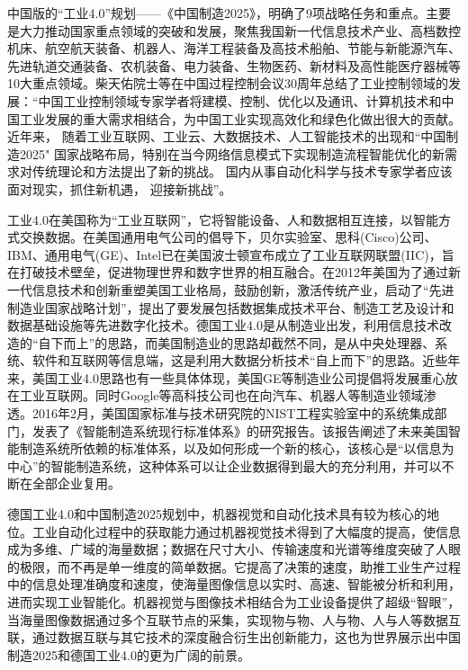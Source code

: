 中国版的“工业4.0”规划——《中国制造2025》，明确了9项战略任务和重点\cite{china2025}。主要是大力推动国家重点领域的突破和发展，聚焦我国新一代信息技术产业、高档数控机床、航空航天装备、机器人、海洋工程装备及高技术船舶、节能与新能源汽车、先进轨道交通装备、农机装备、电力装备、生物医药、新材料及高性能医疗器械等10大重点领域。柴天佑院士等在中国过程控制会议30周年总结了工业控制领域的发展\cite{cai2017ASS}：“中国工业控制领域专家学者将建模、控制、优化以及通讯、计算机技术和中国工业发展的重大需求相结合，为中国工业实现高效化和绿色化做出很大的贡献。 近年来， 随着工业互联网、工业云、大数据技术、人工智能技术的出现和“中国制造2025" 国家战略布局，特别在当今网络信息模式下实现制造流程智能优化的新需求对传统理论和方法提出了新的挑战。 国内从事自动化科学与技术专家学者应该面对现实，抓住新机遇， 迎接新挑战”。

工业4.0在美国称为“工业互联网”，它将智能设备、人和数据相互连接，以智能方式交换数据。在美国通用电气公司的倡导下，贝尔实验室、思科(Cisco)公司、IBM、通用电气(GE)、Intel已在美国波士顿宣布成立了工业互联网联盟(IIC)，旨在打破技术壁垒，促进物理世界和数字世界的相互融合。在2012年美国为了通过新一代信息技术和创新重塑美国工业格局，鼓励创新，激活传统产业，启动了“先进制造业国家战略计划”\cite{US2012}，提出了要发展包括数据集成技术平台、制造工艺及设计和数据基础设施等先进数字化技术。德国工业4.0是从制造业出发，利用信息技术改造的“自下而上”的思路，而美国制造业的思路却截然不同，是从中央处理器、系统、软件和互联网等信息端，这是利用大数据分析技术“自上而下”的思路。近些年来，美国工业4.0思路也有一些具体体现，美国GE等制造业公司提倡将发展重心放在工业互联网。同时Google等高科技公司也在向汽车、机器人等制造业领域渗透\cite{US2014,USA2015}。2016年2月，美国国家标准与技术研究院的NIST工程实验室中的系统集成部门，发表了《智能制造系统现行标准体系》的研究报告\cite{Lu2015Standards}。该报告阐述了未来美国智能制造系统所依赖的标准体系，以及如何形成一个新的核心，该核心是“以信息为中心”的智能制造系统，这种体系可以让企业数据得到最大的充分利用，并可以不断在全部企业复用。

德国工业4.0和中国制造2025规划中，机器视觉和自动化技术具有较为核心的地位。工业自动化过程中的获取能力通过机器视觉技术得到了大幅度的提高，使信息成为多维、广域的海量数据；数据在尺寸大小、传输速度和光谱等维度突破了人眼的极限，而不再是单一维度的简单数据。它提高了决策的速度，助推工业生产过程中的信息处理准确度和速度，使海量图像信息以实时、高速、智能被分析和利用，进而实现工业智能化。机器视觉与图像技术相结合为工业设备提供了超级“智眼”，当海量图像数据通过多个互联节点的采集，实现物与物、人与物、人与人等数据互联，通过数据互联与其它技术的深度融合衍生出创新能力，这也为世界展示出中国制造2025和德国工业4.0的更为广阔的前景。

